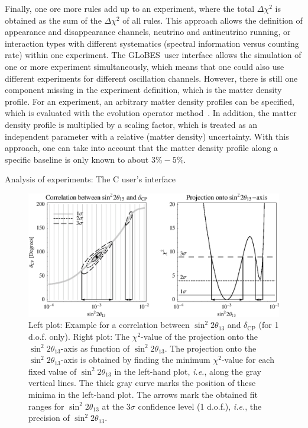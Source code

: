 \documentclass[12pt,a4paper]{article}
\makeatletter
\newcommand{\capdef}{}
\newcommand{\mycaption}[2][\capdef]{\renewcommand{\capdef}{#2}%
       \caption[#1]{{\footnotesize #2}}}
\renewcommand{\section}{\@startsection{section}{1}{0em}{-\baselineskip}%
{\baselineskip}{\normalfont\large\bfseries}}
\newcommand{\ie}{{\it i.e.}}
\newcommand{\deltacp}{\delta_{\mathrm{CP}}}
\newcommand{\stheta}{\sin^2 2 \theta_{13}}
\newcommand{\GLOBES}{{\sf GLoBES}}
\makeatother
\begin{document}
Finally, one ore more rules add up to an experiment, where the
total $\Delta \chi^2$ is obtained as the sum of the $\Delta \chi^2$
of all rules. This approach allows the definition of 
appearance and disappearance channels, neutrino and antineutrino running, 
or interaction types with different systematics (spectral information
versus counting rate) within one experiment. The \GLOBES\ user interface
allows the simulation of one or more experiment simultaneously, which
means that one could also use different experiments for different
oscillation channels. However, there is still one component missing
in the experiment definition, which is the matter density profile.
For an experiment, an arbitrary matter density profiles can be specified, 
which is evaluated with the evolution operator method~\cite{Ohlsson:1999um}.
In addition, the matter density profile is multiplied by a scaling factor, 
which is treated as an independent parameter
with a relative (matter density) uncertainty. With this
approach, one can take into account that the matter density profile along a 
specific baseline is only known to about $3\%-5\%$. 

\section{Analysis of experiments: The C user's interface}

\begin{figure}[t]
\begin{center}
\includegraphics[width=16cm]{projex}
\end{center}
\mycaption{\label{fig:projex} Left plot: Example for a  correlation between $\stheta$ and $\deltacp$ (for 1 d.o.f. only). Right plot: The $\chi^2$-value of the projection onto the $\stheta$-axis as function of $\stheta$. The projection onto the  $\stheta$-axis is obtained by finding the minimum $\chi^2$-value for each fixed value of $\stheta$ in the left-hand plot, \ie, along the gray vertical lines. The thick gray curve marks the position of these minima in the left-hand plot. The arrows mark the obtained fit ranges for $\stheta$ at the $3 \sigma$ confidence level (1 d.o.f.), \ie , the precision of $\stheta$.}
\end{figure}
\end{document}
